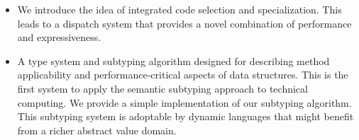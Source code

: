 \begin{itemize}
\item We introduce the idea of integrated code selection and specialization.
This leads to a dispatch system that provides a novel combination of
performance and expressiveness.







\item A type system and subtyping algorithm designed for describing
method applicability and performance-critical aspects of data structures.
This is the first system to apply the semantic subtyping approach
to technical computing.
We provide a simple implementation of our subtyping algorithm.
This subtyping system is adoptable by dynamic languages that might
benefit from a richer abstract value domain.





\end{itemize}
